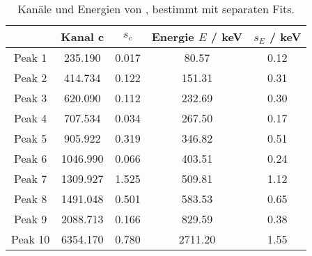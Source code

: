 \begin{table}[H]
\caption{Kan\"ale und Energien von \th, bestimmt mit separaten Fits.}
\begin{center}
\begin{tabular}{|c|c|c|c|c|}
  \hline
   & Kanal c & $s_c$ & Energie $E$ / keV & $s_E$ / keV \\ \hline
  Peak 1 & 235.190 & 0.017 & 80.57 & 0.12 \\ \hline
  Peak 2 & 414.734 & 0.122 & 151.31 & 0.31 \\ \hline
  Peak 3 & 620.090 & 0.112 & 232.69 & 0.30 \\ \hline
  Peak 4 & 707.534 & 0.034 & 267.50 & 0.17 \\ \hline
  Peak 5 & 905.922 & 0.319 & 346.82 & 0.51 \\ \hline
  Peak 6 & 1046.990 & 0.066 & 403.51 & 0.24 \\ \hline
  Peak 7 & 1309.927 & 1.525 & 509.81 & 1.12 \\ \hline
  Peak 8 & 1491.048 & 0.501 & 583.53 & 0.65 \\ \hline
  Peak 9 & 2088.713 & 0.166 & 829.59 & 0.38 \\ \hline
  Peak 10 & 6354.170 & 0.780 & 2711.20 & 1.55 \\ \hline
\end{tabular}
\end{center}
\label{tab:th:single}
\end{table}
